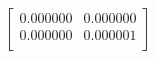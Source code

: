 \begin{equation}
\left[
\begin{array}{cc}
0.000000 & 0.000000 \\
0.000000 & 0.000001 \\
\end{array}
\right]
\end{equation}
